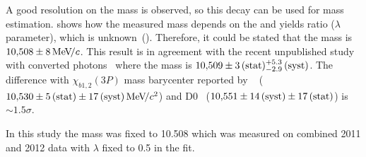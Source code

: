 A good resolution on the \chiboneThreeP mass is observed, so this decay can be
used for \chiboneThreeP mass estimation.  shows how
the measured \chiboneThreeP mass depends on the \chiboneThreeP and \chibtwoThreeP
yields ratio ($\lambda$ parameter), which is unknown~(). 
Therefore, it could be stated that the \chiboneThreeP mass is $10{,}508 \pm 8{\mathrm{\,Me\kern -0.1em V\!/}c}$.
This result is in agreement with the recent unpublished 
\lhcb study with converted photons~\cite{edwige} where the \chiboneThreeP mass is
$10{,}509 \pm 3\mathrm{\,(stat)}{}^{+5.3}_{-2.9}\mathrm{\,(syst)}$. The difference with
$\chi_{b1,2}(3P)$ mass barycenter reported by \atlas~\cite{Aad:2011ih} ($10{,}530 \pm 5\mathrm{\,(stat)}
\pm 17\mathrm{\,(syst)} {\mathrm{\,Me\kern -0.1em V\!/}c^2}$) and D0~\cite{Abazov:2012gh}  ($10{,}551 \pm 14\mathrm{\,(syst)} \pm 17\mathrm{\,(stat)}$)
is~$\sim{}1.5\sigma$.




In this study the mass was fixed to 10.508 \gevcc which was measured 
on combined 2011 and 2012 data with $\lambda$ fixed to 0.5 in the fit.





